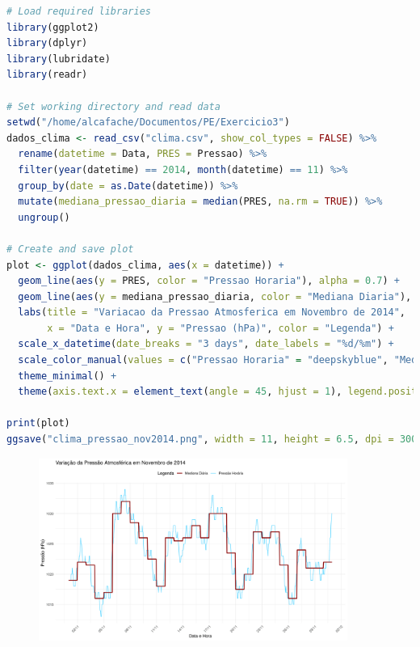 \documentclass[11pt,a4paper]{article}
\begin{document}
\begin{lstlisting}[language=R]
# Load required libraries
library(ggplot2)
library(dplyr)
library(lubridate)
library(readr)

# Set working directory and read data
setwd("/home/alcafache/Documentos/PE/Exercicio3")
dados_clima <- read_csv("clima.csv", show_col_types = FALSE) %>%
  rename(datetime = Data, PRES = Pressao) %>%
  filter(year(datetime) == 2014, month(datetime) == 11) %>%
  group_by(date = as.Date(datetime)) %>%
  mutate(mediana_pressao_diaria = median(PRES, na.rm = TRUE)) %>%
  ungroup()

# Create and save plot
plot <- ggplot(dados_clima, aes(x = datetime)) +
  geom_line(aes(y = PRES, color = "Pressao Horaria"), alpha = 0.7) +
  geom_line(aes(y = mediana_pressao_diaria, color = "Mediana Diaria"), linewidth = 1) +
  labs(title = "Variacao da Pressao Atmosferica em Novembro de 2014",
       x = "Data e Hora", y = "Pressao (hPa)", color = "Legenda") +
  scale_x_datetime(date_breaks = "3 days", date_labels = "%d/%m") +
  scale_color_manual(values = c("Pressao Horaria" = "deepskyblue", "Mediana Diaria" = "red4")) +
  theme_minimal() +
  theme(axis.text.x = element_text(angle = 45, hjust = 1), legend.position = "top")

print(plot)
ggsave("clima_pressao_nov2014.png", width = 11, height = 6.5, dpi = 300)
\end{lstlisting}

\begin{figure}[htbp]
    \centering
    \includegraphics[width=0.9\textwidth]{clima_pressao_nov2014.png}
\end{figure}
\end{document}
